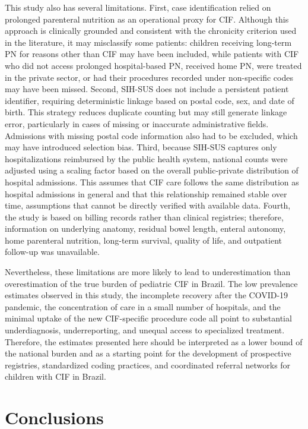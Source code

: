 \documentclass[12pt,a4paper]{article}
\theoremstyle{plain}
\theoremstyle{definition}
\theoremstyle{remark}
\begin{document}
This study also has several limitations. First, case identification relied on prolonged parenteral nutrition as an operational proxy for CIF. Although this approach is clinically grounded and consistent with the chronicity criterion used in the literature, it may misclassify some patients: children receiving long-term PN for reasons other than CIF may have been included, while patients with CIF who did not access prolonged hospital-based PN, received home PN, were treated in the private sector, or had their procedures recorded under non-specific codes may have been missed. Second, SIH-SUS does not include a persistent patient identifier, requiring deterministic linkage based on postal code, sex, and date of birth. This strategy reduces duplicate counting but may still generate linkage error, particularly in cases of missing or inaccurate administrative fields. Admissions with missing postal code information also had to be excluded, which may have introduced selection bias. Third, because SIH-SUS captures only hospitalizations reimbursed by the public health system, national counts were adjusted using a scaling factor based on the overall public-private distribution of hospital admissions. This assumes that CIF care follows the same distribution as hospital admissions in general and that this relationship remained stable over time, assumptions that cannot be directly verified with available data. Fourth, the study is based on billing records rather than clinical registries; therefore, information on underlying anatomy, residual bowel length, enteral autonomy, home parenteral nutrition, long-term survival, quality of life, and outpatient follow-up was unavailable.

Nevertheless, these limitations are more likely to lead to underestimation than overestimation of the true burden of pediatric CIF in Brazil. The low prevalence estimates observed in this study, the incomplete recovery after the COVID-19 pandemic, the concentration of care in a small number of hospitals, and the minimal uptake of the new CIF-specific procedure code all point to substantial underdiagnosis, underreporting, and unequal access to specialized treatment. Therefore, the estimates presented here should be interpreted as a lower bound of the national burden and as a starting point for the development of prospective registries, standardized coding practices, and coordinated referral networks for children with CIF in Brazil.


\section{Conclusions}\label{sec5}
\end{document}
